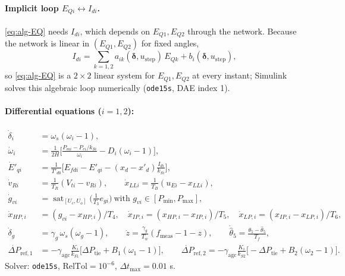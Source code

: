 \documentclass[11pt,a4paper]{article}
\numberwithin{equation}{section}
\newcommand{\sat}{\operatorname{sat}}
\begin{document}
\paragraph{Implicit loop $E_{Qi}\leftrightarrow I_{di}$.} \eqref{eq:alg-EQ} needs $I_{di}$, which depends on $E_{Q1},E_{Q2}$ through the network. Because the network is linear in $(E_{Q1},E_{Q2})$ for fixed angles,
\begin{equation}
I_{di} = \sum_{k=1,2} a_{ik}(\bm\delta,u_{\text{step}})\,E_{Qk} + b_i(\bm\delta,u_{\text{step}}),
\end{equation}
so \eqref{eq:alg-EQ} is a $2\times 2$ linear system for $E_{Q1},E_{Q2}$ at every instant; Simulink solves this algebraic loop numerically (\texttt{ode15s}, DAE index 1).
\paragraph{Differential equations ($i=1,2$):}
\begin{align}
\dot\delta_i &= \omega_s(\omega_i-1),\\
\dot\omega_i &= \frac{1}{2H}\Big[\frac{P_{mi}-P_{ei}/k_{Si}}{\omega_i} - D_i(\omega_i-1)\Big],\\
\dot E'_{qi} &= \frac{1}{T'_{d0}}\Big[E_{fdi} - E'_{qi} - (x_d-x'_d)\frac{I_{di}}{k_{Si}}\Big],\\
\dot v_{Ri} &= \frac{1}{T_R}(V_{ti} - v_{Ri}),\qquad
\dot x_{LLi} = \frac{1}{T_B}(u_{Ei} - x_{LLi}),\\
\dot g_{vi} &= \sat_{[U_c,U_o]}\Big(\frac{1}{T_3}e_{gi}\Big)\ \text{with } g_{vi}\in[P_{\min},P_{\max}],\\
\dot x_{HP,i} &= (g_{vi}-x_{HP,i})/T_4,\quad
\dot x_{IP,i} = (x_{HP,i}-x_{IP,i})/T_5,\quad
\dot x_{LP,i} = (x_{IP,i}-x_{LP,i})/T_6,\\
\dot\delta_g &= \gamma_g\,\omega_s(\omega_g-1),\qquad
\dot z = \frac{\gamma_g}{T_w}(f_{\text{meas}}-1-z),\qquad
\dot{\hat\theta}_5 = \frac{\theta_5-\hat\theta_5}{T_f},\\
\dot{\Delta P}_{\text{ref},1} &= -\gamma_{\text{agc}}\frac{K_i}{k_{S1}}\big[\Delta P_{\text{tie}} + B_1(\omega_1-1)\big],\qquad
\dot{\Delta P}_{\text{ref},2} = -\gamma_{\text{agc}}\frac{K_i}{k_{S2}}\big[-\Delta P_{\text{tie}} + B_2(\omega_2-1)\big].
\end{align}
Solver: \texttt{ode15s}, $\text{RelTol}=10^{-6}$, $\Delta t_{\max}=0.01$ s.
\end{document}
